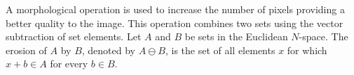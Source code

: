 \documentclass[conference]{IEEEtran}
\begin{document}
A morphological operation is used to increase the number of pixels providing a better quality to the image. This operation combines two sets using the vector subtraction of set elements. Let $A$ and $B$ be sets in the Euclidean $N$-space. The erosion of $A$ by $B$, denoted by $A \ominus B$, is the set of all elements $x$ for which $x + b \in A$ for every $b \in B$.
\end{document}
